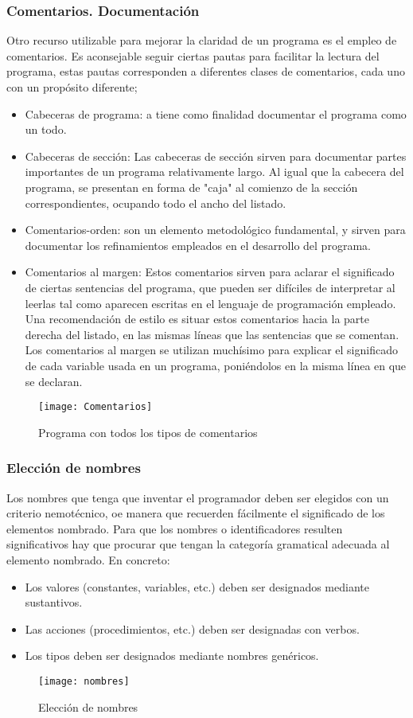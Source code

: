 \documentclass[11pt,a4paper]{article}
\begin{document}
 \subsubsection{Comentarios. Documentación}
 Otro recurso utilizable para mejorar la claridad de un programa es el empleo de comentarios. Es aconsejable seguir ciertas pautas para facilitar la lectura del programa, estas pautas corresponden a diferentes clases de comentarios, cada uno con un propósito diferente;
 \begin{itemize}
 	\item Cabeceras de programa: a tiene como finalidad documentar el programa como 
 	un todo. 
 	\item Cabeceras de sección: Las cabeceras de sección sirven para documentar partes importantes de un programa relativamente largo. Al igual que la cabecera del programa, se presentan 
 	en forma de "caja" al comienzo de la sección correspondientes, ocupando todo 
 	el ancho del listado.
 	\item Comentarios-orden: son un elemento metodológico fundamental, y sirven 
 	para documentar los refinamientos empleados en el desarrollo del programa.
 	\item Comentarios al margen: Estos comentarios sirven para aclarar el significado de ciertas sentencias del 
 	programa, que pueden ser difíciles de interpretar al leerlas tal como aparecen 
 	escritas en el lenguaje de programación empleado. Una recomendación de 
 	estilo es situar estos comentarios hacia la parte derecha del listado, en las 
 	mismas líneas que las sentencias que se comentan. Los comentarios al margen se utilizan muchísimo para explicar el significado 
 	de cada variable usada en un programa, poniéndolos en la misma línea en que 
 	se declaran.
 \end{itemize}
  \begin{figure}[htb]
 	\centering
 	\texttt{[image: Comentarios]}
 	\caption{Programa con todos los tipos de comentarios}
 	\label{fig:Comentarios}
 \end{figure} 
 \subsubsection{Elección de nombres}
 Los nombres que tenga que inventar el programador
 deben ser elegidos con un criterio nemotécnico, oe manera que recuerden fácilmente el significado de los elementos nombrado.
 Para que los nombres o identificadores resulten significativos hay que procurar que tengan la categoría gramatical adecuada al elemento nombrado. En 
 concreto:
 \begin{itemize}
 	\item Los valores (constantes, variables, etc.) deben ser designados mediante 
 	sustantivos.
 	\item Las acciones (procedimientos, etc.) deben ser designadas con verbos.
 	\item Los tipos deben ser designados mediante nombres genéricos.  
 \end{itemize}
 \begin{figure}[htb]
 	\centering
 	\texttt{[image: nombres]}
 	\caption{Elección de nombres}
 	\label{fig:Comentarios}
 \end{figure}
\end{document}
